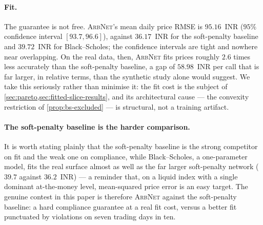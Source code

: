 \documentclass[largeformat]{interact}
\theoremstyle{plain}
\theoremstyle{definition}
\newcommand{\arbnet}{\textsc{ArbNet}}
\newcommand{\bs}{Black--Scholes}
\begin{document}
\paragraph{Fit.}
The guarantee is not free. \arbnet{}'s mean daily price RMSE is $95.16$~INR ($95\%$ confidence interval $[93.7, 96.6]$), against $36.17$~INR for the soft-penalty baseline and $39.72$~INR for \bs{}; the confidence intervals are tight and nowhere near overlapping. On the real data, then, \arbnet{} fits prices roughly $2.6$ times less accurately than the soft-penalty baseline, a gap of $58.98$~INR per call that is far larger, in relative terms, than the synthetic study alone would suggest. We take this seriously rather than minimise it: the fit cost is the subject of \cref{sec:pareto,sec:fitted-slice-results}, and its architectural cause --- the convexity restriction of \cref{prop:bs-excluded} --- is structural, not a training artifact.

\paragraph{The soft-penalty baseline is the harder comparison.}
It is worth stating plainly that the soft-penalty baseline is the strong competitor on fit and the weak one on compliance, while \bs{}, a one-parameter model, fits the real surface almost as well as the far larger soft-penalty network ($39.7$ against $36.2$~INR) --- a reminder that, on a liquid index with a single dominant at-the-money level, mean-squared price error is an easy target. The genuine contest in this paper is therefore \arbnet{} against the soft-penalty baseline: a hard compliance guarantee at a real fit cost, versus a better fit punctuated by violations on seven trading days in ten.
\end{document}
